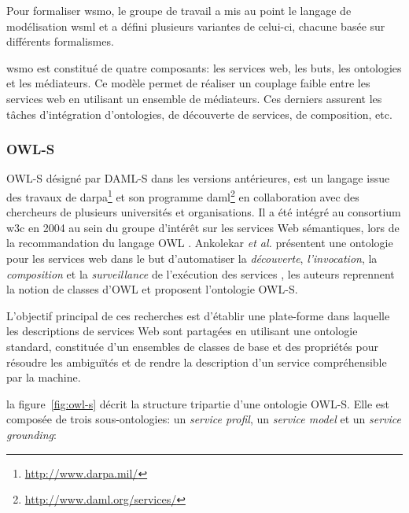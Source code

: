     Pour formaliser \acrshort{wsmo}, le groupe de travail a mis au
    point le langage de modélisation \acrshort{wsml} \cite{de2006web}
    et a défini plusieurs variantes de celui-ci, chacune basée sur
    différents formalismes.\medskip

    \acrshort{wsmo} est constitué de quatre composants: les services
    web, les buts, les ontologies et les médiateurs. Ce modèle permet
    de réaliser un couplage faible entre les services web en utilisant
    un ensemble de médiateurs. Ces derniers assurent les tâches
    d'intégration d'ontologies, de découverte de services, de
    composition, etc.

    \subsubsection{OWL-S}
    \label{sec:owl-s-1}
    \textsc{OWL-S} \cite{martin2004owl} désigné par \textsc{DAML-S}
    \cite{ankolekar2002daml} dans les versions antérieures, est un
    langage issue des travaux de
    \acrshort{darpa}\footnote{\url{http://www.darpa.mil/}} et son
    programme
    \acrshort{daml}\footnote{\url{http://www.daml.org/services/}} en
    collaboration avec des chercheurs de plusieurs universités et
    organisations. Il a été intégré au consortium \acrshort{w3c} en
    2004 au sein du groupe d'intérêt sur les services Web sémantiques,
    lors de la recommandation du langage \textsc{OWL}
    \cite{horrocks2002daml+oil, mcguinness2004owl}. Ankolekar \emph{et
      al.}  \cite{ankolekar2002daml} présentent une ontologie pour les
    services web dans le but d'automatiser la \emph{découverte},
    \emph{l'invocation}, la \emph{composition} et la
    \emph{surveillance} de l'exécution des services
    \cite{mcilraith2003bringing}, les auteurs reprennent la notion de
    classes d'\textsc{OWL} et proposent l'ontologie
    \textsc{OWL-S}.\bigskip

    

    L'objectif principal de ces recherches est d'établir une
    plate-forme dans laquelle les descriptions de services Web sont
    partagées en utilisant une ontologie standard, constituée d'un
    ensembles de classes de base et des propriétés pour résoudre les
    ambiguïtés et de rendre la description d'un service compréhensible
    par la machine.\bigskip

    la figure~\ref{fig:owl-s} décrit la structure tripartie d'une
    ontologie \textsc{OWL-S}. Elle est composée de trois
    sous-ontologies: un \emph{service profil}, un \emph{service model}
    et un \emph{service grounding}:

